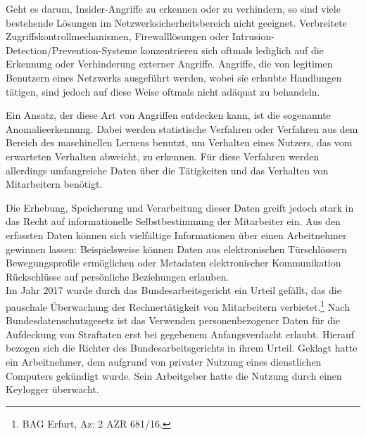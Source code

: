 
Geht es darum, Insider-Angriffe zu erkennen oder zu verhindern, so sind viele bestehende Lösungen im Netzwerksicherheitsbereich nicht geeignet. Verbreitete Zugriffskontrollmechanismen, Firewalllösungen oder Intrusion-Detection/Prevention-Systeme konzentrieren sich oftmals lediglich auf die Erkennung oder Verhinderung externer Angriffe. Angriffe, die von legitimen Benutzern eines Netzwerks ausgeführt werden, wobei sie erlaubte Handlungen tätigen, sind jedoch auf diese Weise oftmals nicht adäquat zu behandeln.

Ein Ansatz, der diese Art von Angriffen entdecken kann, ist die sogenannte Anomalieerkennung. Dabei werden statistische Verfahren oder Verfahren aus dem Bereich des maschinellen Lernens benutzt, um Verhalten eines Nutzers, das vom erwarteten Verhalten abweicht, zu erkennen. 
Für diese Verfahren werden allerdings umfangreiche Daten über die Tätigkeiten und das Verhalten von Mitarbeitern benötigt.


Die Erhebung, Speicherung und Verarbeitung dieser Daten greift jedoch stark in das Recht auf informationelle Selbstbestimmung der Mitarbeiter ein. Aus den erfassten Daten können sich vielfältige Informationen über einen Arbeitnehmer gewinnen lassen: Beispielsweise können Daten aus elektronischen Türschlössern Bewegungsprofile ermöglichen oder Metadaten elektronischer Kommunikation Rückschlüsse auf persönliche Beziehungen erlauben.\\
Im Jahr 2017 wurde durch das Bundesarbeitsgericht ein Urteil gefällt, das die pauschale Überwachung der Rechnertätigkeit von Mitarbeitern verbietet.\footnote{
  BAG Erfurt, Az: 2 AZR 681/16.
} Nach Bundesdatenschutzgesetz ist das Verwenden personenbezogener Daten für die Aufdeckung von Straftaten erst bei gegebenem Anfangsverdacht erlaubt. Hierauf bezogen sich die Richter des Bundesarbeitsgerichts in ihrem Urteil. Geklagt hatte ein Arbeitnehmer, dem aufgrund von privater Nutzung eines dienstlichen Computers gekündigt wurde. Sein Arbeitgeber hatte die Nutzung durch einen Keylogger überwacht. 


